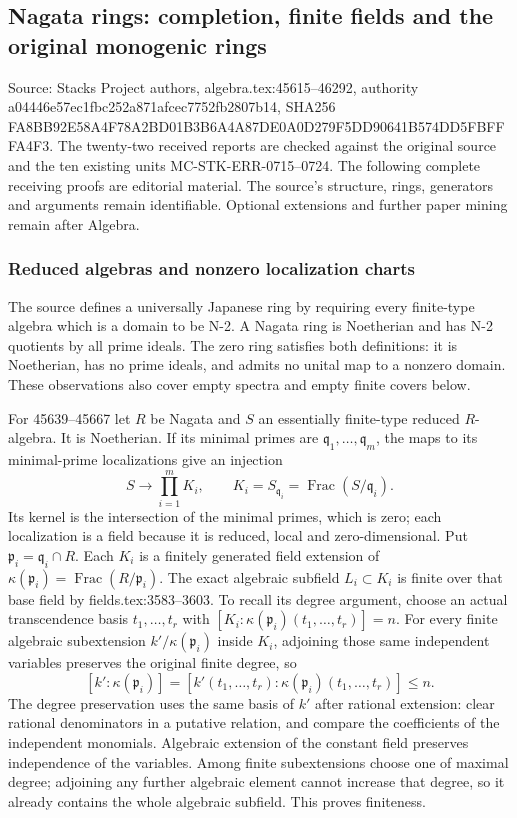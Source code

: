 \subsection{Nagata rings: completion, finite fields and the original monogenic rings}\label{nagata-rings-completion-finite-fields-and-the-original-monogenic-rings}

Source: Stacks Project authors, algebra.tex:45615--46292, authority a04446e57ec1fbc252a871afcec7752fb2807b14, SHA256 FA8BB92E58A4F78A2BD01B3B6A4A87DE0A0D279F5DD90641B574DD5FBFFFA4F3. The twenty-two received reports are checked against the original source and the ten existing units MC-STK-ERR-0715--0724. The following complete receiving proofs are editorial material. The source's structure, rings, generators and arguments remain identifiable. Optional extensions and further paper mining remain after Algebra.

\subsubsection{Reduced algebras and nonzero localization charts}\label{reduced-algebras-and-nonzero-localization-charts}

The source defines a universally Japanese ring by requiring every finite-type algebra which is a domain to be N-2. A Nagata ring is Noetherian and has N-2 quotients by all prime ideals. The zero ring satisfies both definitions: it is Noetherian, has no prime ideals, and admits no unital map to a nonzero domain. These observations also cover empty spectra and empty finite covers below.

For 45639--45667 let \(R\) be Nagata and \(S\) an essentially finite-type reduced \(R\)-algebra. It is Noetherian. If its minimal primes are \(\mathfrak q_1,\ldots,\mathfrak q_m\), the maps to its minimal-prime localizations give an injection \[
 S\longrightarrow\prod_{i=1}^m K_i,
 \qquad K_i=S_{\mathfrak q_i}=\operatorname{Frac}(S/\mathfrak q_i).
\] Its kernel is the intersection of the minimal primes, which is zero; each localization is a field because it is reduced, local and zero-dimensional. Put \(\mathfrak p_i=\mathfrak q_i\cap R\). Each \(K_i\) is a finitely generated field extension of \(\kappa(\mathfrak p_i)=\operatorname{Frac}(R/\mathfrak p_i)\). The exact algebraic subfield \(L_i\subset K_i\) is finite over that base field by fields.tex:3583--3603. To recall its degree argument, choose an actual transcendence basis \(t_1,\ldots,t_r\) with \([K_i:\kappa(\mathfrak p_i)(t_1,\ldots,t_r)]=n\). For every finite algebraic subextension \(k'/\kappa(\mathfrak p_i)\) inside \(K_i\), adjoining those same independent variables preserves the original finite degree, so \[
 [k':\kappa(\mathfrak p_i)]
 =[k'(t_1,\ldots,t_r):\kappa(\mathfrak p_i)(t_1,\ldots,t_r)]\leq n.
\] The degree preservation uses the same basis of \(k'\) after rational extension: clear rational denominators in a putative relation, and compare the coefficients of the independent monomials. Algebraic extension of the constant field preserves independence of the variables. Among finite subextensions choose one of maximal degree; adjoining any further algebraic element cannot increase that degree, so it already contains the whole algebraic subfield. This proves finiteness.

